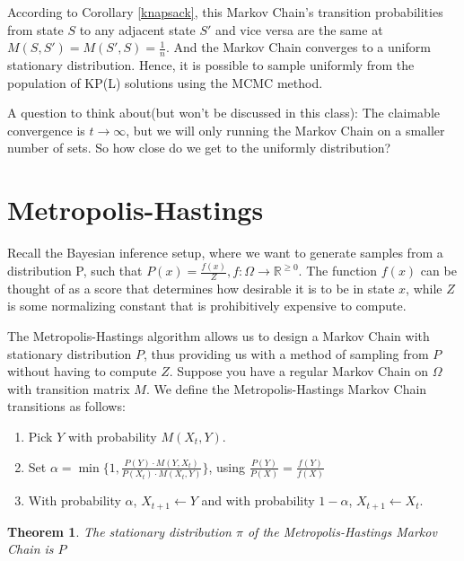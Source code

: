 \documentclass[twoside]{article}
\newcounter{lecnum}
\newtheorem{theorem}{Theorem}[lecnum]
\begin{document}
According to Corollary \ref{knapsack}, this Markov Chain's transition probabilities from state $S$ to any adjacent state $S'$ and vice versa are the same at $M(S, S') = M(S', S) = \frac{1}{n}$. And the Markov Chain converges to a uniform stationary distribution. Hence, it is possible to sample uniformly from the population of KP(L) solutions using the MCMC method.

A question to think about(but won't be discussed in this class): The claimable convergence is $t \rightarrow \infty$, but we will only running the Markov Chain on a smaller number of sets. So how close do we get to the uniformly distribution?






\section{Metropolis-Hastings}

Recall the Bayesian inference setup, where we want to generate samples from a distribution P, such that $P(x) = \frac{f(x)}{Z}, f: \Omega \rightarrow \mathbb{R}^{\geq 0}$. The function $f(x)$ can be thought of as a score that determines how desirable it is to be in state $x$, while $Z$ is some normalizing constant that is prohibitively expensive to compute. 

The Metropolis-Hastings algorithm allows us to design a Markov Chain with stationary distribution $P$, thus providing us with a method of sampling from $P$ without having to compute $Z$. Suppose you have a regular Markov Chain on $\Omega$ with transition matrix $M$. We define the Metropolis-Hastings Markov Chain transitions as follows:

\begin{enumerate}
   \item Pick $Y$ with probability $M(X_t, Y)$.
   \item Set $\alpha = \min\{ 1, \frac{P(Y) \cdot M(Y, X_t)}{P(X_t) \cdot M(X_t, Y)} \}$, using $\frac{P(Y)}{P(X)} = \frac{f(Y)}{f(X)}$
   \item With probability $\alpha$, $X_{t+1} \leftarrow Y$ and with probability $1 - \alpha$, $X_{t+1} \leftarrow X_t$.
\end{enumerate}

\begin{theorem}
  The stationary distribution $\pi$ of the Metropolis-Hastings Markov Chain is $P$
\end{theorem}
\end{document}
